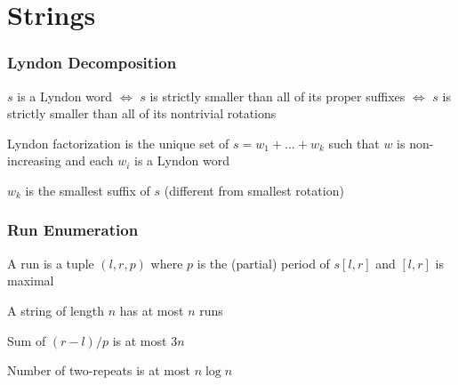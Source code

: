 \chapter{Strings}


\subsection{Lyndon Decomposition}


$s$ is a Lyndon word $\iff$ $s$ is strictly smaller than all of its proper suffixes $\iff$ $s$ is strictly smaller than all of its nontrivial rotations

Lyndon factorization is the unique set of $s = w_1 + ... + w_k$ such that $w$ is non-increasing and each $w_i$ is a Lyndon word

$w_k$ is the smallest suffix of $s$ (different from smallest rotation)

\subsection{Run Enumeration}

A run is a tuple $(l, r, p)$ where $p$ is the (partial) period of $s[l, r]$ and $[l, r]$ is maximal

A string of length $n$ has at most $n$ runs

Sum of $(r - l) / p$ is at most $3n$

Number of two-repeats is at most $n \log n$

